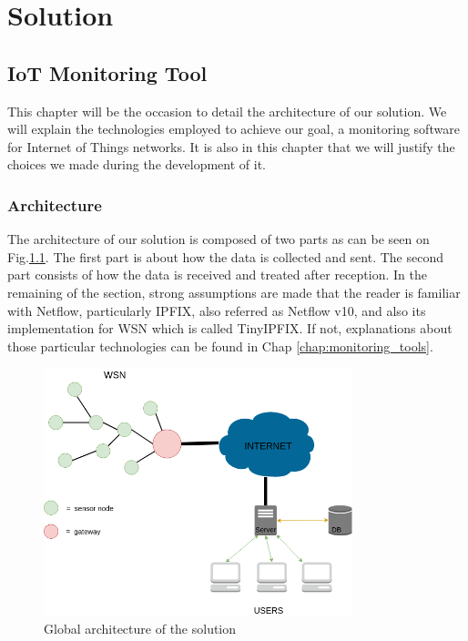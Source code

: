 \part{Solution} \label{part:solution}

\chapter{IoT Monitoring Tool}

This chapter will be the occasion to detail the architecture of our solution. We will explain the technologies employed to achieve our goal, a monitoring software for Internet of Things networks. It is also in this chapter that we will justify the choices we made during the development of it.

\section{Architecture}

The architecture of our solution is composed of two parts as can be seen on Fig.\ref{fig:design}. The first part is about how the data is collected and sent. The second part consists of how the data is received and treated after reception. In the remaining of the section, strong assumptions are made that the reader is familiar with Netflow, particularly IPFIX, also referred as Netflow v10, and also its implementation for WSN which is called TinyIPFIX. If not, explanations about those particular technologies can be found in Chap \ref{chap:monitoring_tools}. \\

\begin{figure}
	\centering
	\includegraphics[width=0.8\textwidth]{res/design.png}
	\caption{Global architecture of the solution}
	\label{fig:design}
\end{figure}

